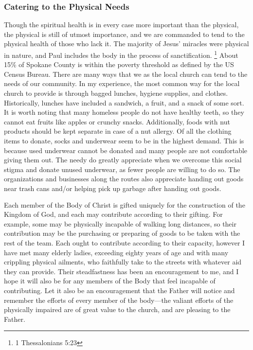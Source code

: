 \subsubsection{Catering to the Physical Needs}

    \qJamesPhysical
    Though the spiritual health is in every case more important than the physical, the physical is still of utmost importance, and we are commanded to tend to the physical health of those who lack it.
    The majority of Jesus' miracles were physical in nature, and Paul includes the body in the process of sanctification.
    \footnote{1 Thessalonians 5:23}
    About 15\% of Spokane County is within the poverty threshold as defined by the US Census Bureau\cite{census}.
    There are many ways that we as the local church can tend to the needs of our community.
    In my experience, the most common way for the local church to provide is through bagged lunches, hygiene supplies, and clothes.
    Historically, lunches have included a sandwich, a fruit, and a snack of some sort.
    It is worth noting that many homeless people do not have healthy teeth, so they cannot eat fruits like apples or crunchy snacks.
    Additionally, foods with nut products should be kept separate in case of a nut allergy.
    Of all the clothing items to donate, socks and underwear seem to be in the highest demand.
    This is because used underwear cannot be donated and many people are not comfortable giving them out.
    The needy do greatly appreciate when we overcome this social stigma and donate unused underwear, as fewer people are willing to do so.
    The organizations and businesses along the routes also appreciate handing out goods near trash cans and/or helping pick up garbage after handing out goods.

    \qHebSix
    Each member of the Body of Christ is gifted uniquely for the construction of the Kingdom of God, and each may contribute according to their gifting.
    For example, some may be physically incapable of walking long distances, so their contribution may be the purchasing or preparing of goods to be taken with the rest of the team.
    Each ought to contribute according to their capacity, however I have met many elderly ladies, exceeding eighty years of age and with many crippling physical ailments, who faithfully take to the streets with whatever aid they can provide.
    Their steadfastness has been an encouragement to me, and I hope it will also be for any members of the Body that feel incapable of contributing.
    Let it also be an encouragement that the Father will notice and remember the efforts of every member of the body---the valiant efforts of the physically impaired are of great value to the church, and are pleasing to the Father.


